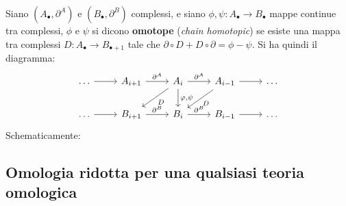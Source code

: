 \begin{definition}
  Siano $ (A_\bullet, \partial^A) $ e $ (B_\bullet, \partial^B) $ complessi, e siano $ \phi, \psi \colon A_\bullet \to B_\bullet $
  mappe continue tra complessi, $ \phi $ e $ \psi $ si dicono \textbf{omotope}
  (\emph{chain homotopic}) se esiste una mappa tra complessi $ D \colon A_\bullet \to B_{\bullet + 1} $
  tale che $ \partial \circ D + D \circ \partial = \phi - \psi $. Si ha quindi il diagramma:
  \[
    \begin{tikzcd}
      \dots \rar & A_{i+1} \rar{\partial^A} & A_i \rar{\partial^A} \arrow{dl}{D} \dar{\phi,\psi} & A_{i-1} \rar \arrow{dl}{D}  & \dots \\
      \dots \rar & B_{i+1} \rar{\partial^B} & B_i \rar{\partial^B} & B_{i-1} \rar & \dots
    \end{tikzcd}
  \]
  Schematicamente:
  \begin{figure}[h]
    \centering
  \end{figure}
\end{definition}

\subsection{Omologia ridotta per una qualsiasi teoria omologica}

